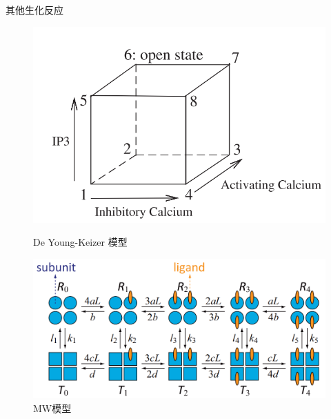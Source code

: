 \documentclass{beamer}
\begin{document}
\begin{frame}{其他生化反应}
		\begin{figure}[h]
			\begin{minipage}[t]{0.4\linewidth}
				\centering
				\includegraphics[scale=0.4]{De Young-Keizer model.png}
				\caption{De Young-Keizer 模型}
			\end{minipage}
			\begin{minipage}[t]{0.4\linewidth}
				\centering
				\includegraphics[scale=0.4]{MWC.png}
				\caption{MW模型}
			\end{minipage}
	    \end{figure}
	\end{frame}
\end{document}
